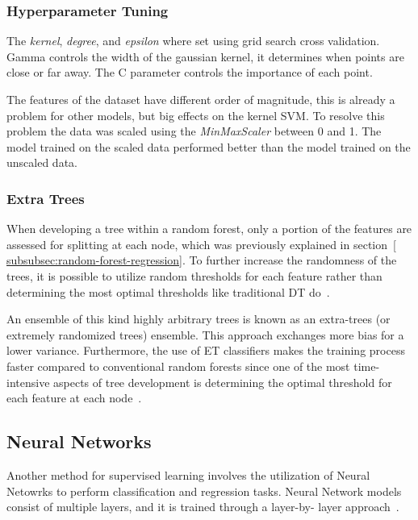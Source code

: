 \subsubsection*{Hyperparameter Tuning}
The \textit{kernel}, \textit{degree},  and \textit{epsilon}
where set using grid
search cross validation.
Gamma controls the width of the gaussian kernel, it determines when points
are close or far away.
The C parameter controls the importance of each point.

The features of the dataset have different order of magnitude, this is
already a problem for other
models, but big effects on the kernel \ac{SVM}.
To resolve this problem the data was scaled using the \textit{MinMaxScaler}
between 0 and 1.
The model trained on the scaled data performed better than the model trained
on the unscaled data.

\subsubsection{Extra Trees}\label{subsubsec:extra-trees}
When developing a tree within a random forest, only a portion of the features are
assessed for splitting at each node, which was previously explained in section~\ref{
    subsubsec:random-forest-regression}.
To further increase the randomness of the trees,
it is possible to utilize random thresholds for each feature rather than determining the
most optimal thresholds like traditional \ac{DT} do~\cite[p. 351]{geron2022hands}.

An ensemble of this kind highly arbitrary trees is known as an extra-trees (or extremely
randomized trees) ensemble.
This approach exchanges more bias for a lower variance.
Furthermore, the use of \ac{ET} classifiers makes the training process faster
compared to conventional random forests since one of the most time-intensive aspects of
tree development is determining the optimal threshold for each feature at
each node~\cite[p. 351]{geron2022hands}.

\subsection{Neural Networks }\label{subsec:neural-networks}
Another method for supervised learning involves the utilization of Neural Netowrks to
perform classification and regression tasks.
Neural Network models consist of multiple layers, and it is trained through a layer-by-
layer approach~\cite[p. 11]{
    dridi2021supervised}.

